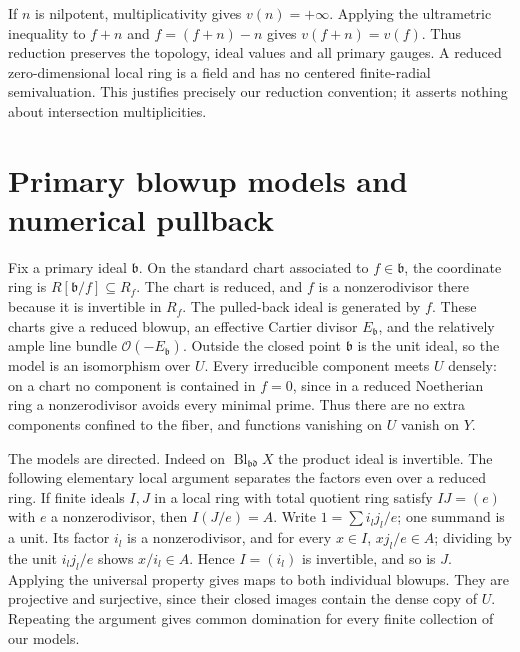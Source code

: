 \documentclass[11pt]{article}
\begin{document}
If \(n\) is nilpotent, multiplicativity gives \(v(n)=+\infty\). Applying the ultrametric inequality to \(f+n\) and \(f=(f+n)-n\) gives \(v(f+n)=v(f)\). Thus reduction preserves the topology, ideal values and all primary gauges. A reduced zero-dimensional local ring is a field and has no centered finite-radial semivaluation. This justifies precisely our reduction convention; it asserts nothing about intersection multiplicities.

\section{Primary blowup models and numerical pullback}

Fix a primary ideal \(\mathfrak b\). On the standard chart associated to \(f\in\mathfrak b\), the coordinate ring is \(R[\mathfrak b/f]\subseteq R_f\). The chart is reduced, and \(f\) is a nonzerodivisor there because it is invertible in \(R_f\). The pulled-back ideal is generated by \(f\). These charts give a reduced blowup, an effective Cartier divisor \(E_{\mathfrak b}\), and the relatively ample line bundle \(\mathcal O(-E_{\mathfrak b})\). Outside the closed point \(\mathfrak b\) is the unit ideal, so the model is an isomorphism over \(U\). Every irreducible component meets \(U\) densely: on a chart no component is contained in \(f=0\), since in a reduced Noetherian ring a nonzerodivisor avoids every minimal prime. Thus there are no extra components confined to the fiber, and functions vanishing on \(U\) vanish on \(Y\).

The models are directed. Indeed on \(\operatorname{Bl}_{\mathfrak b\mathfrak d}X\) the product ideal is invertible. The following elementary local argument separates the factors even over a reduced ring. If finite ideals \(I,J\) in a local ring with total quotient ring satisfy \(IJ=(e)\) with \(e\) a nonzerodivisor, then \(I(J/e)=A\). Write \(1=\sum i_lj_l/e\); one summand is a unit. Its factor \(i_l\) is a nonzerodivisor, and for every \(x\in I\), \(xj_l/e\in A\); dividing by the unit \(i_lj_l/e\) shows \(x/i_l\in A\). Hence \(I=(i_l)\) is invertible, and so is \(J\). Applying the universal property gives maps to both individual blowups. They are projective and surjective, since their closed images contain the dense copy of \(U\). Repeating the argument gives common domination for every finite collection of our models.
\end{document}
